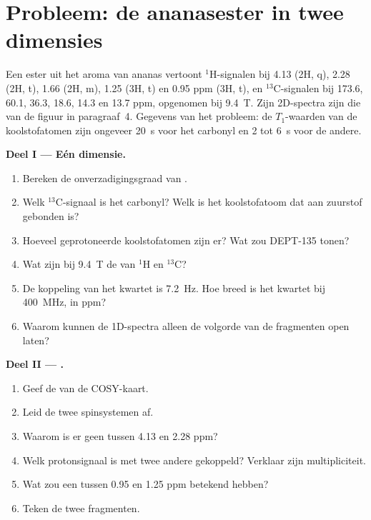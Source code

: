 \section{Probleem: de ananasester in twee dimensies}

\begin{problem}
\label{pb:b3:advanced-nmr:1}
Een ester  uit het aroma van ananas vertoont ${}^1$H-signalen bij 4.13 (2H,
q), 2.28 (2H, t), 1.66 (2H, m), 1.25 (3H, t) en 0.95 ppm (3H, t), en
${}^{13}$C-signalen bij 173.6, 60.1, 36.3, 18.6, 14.3 en 13.7 ppm, opgenomen
bij \qty{9.4}{T}. Zijn 2D-spectra zijn die van de figuur in paragraaf~4.
Gegevens van het probleem: de $T_1$-waarden
van de koolstofatomen zijn ongeveer \qty{20}{s} voor het carbonyl en 2 tot
\qty{6}{s} voor de andere.

\medskip\noindent\textbf{Deel I --- Eén dimensie.}
\begin{enumerate}
  \item Bereken de onverzadigingsgraad van .
  \item Welk ${}^{13}$C-signaal is het carbonyl? Welk is het koolstofatoom
        dat aan zuurstof gebonden is?
  \item Hoeveel geprotoneerde koolstofatomen zijn er? Wat zou DEPT-135 tonen?
  \item Wat zijn bij \qty{9.4}{T} de  van ${}^1$H en ${}^{13}$C?
  \item De koppeling van het kwartet is \qty{7.2}{Hz}. Hoe breed is het
        kwartet bij \qty{400}{MHz}, in ppm?
  \item Waarom kunnen de 1D-spectra alleen de volgorde van de fragmenten
        open laten?
\end{enumerate}

\medskip\noindent\textbf{Deel II --- .}
\begin{enumerate}[resume]
  \item Geef de  van de COSY-kaart.
  \item Leid de twee spinsystemen af.
  \item Waarom is er geen  tussen 4.13 en 2.28 ppm?
  \item Welk protonsignaal is met twee andere gekoppeld? Verklaar zijn
        multipliciteit.
  \item Wat zou een  tussen 0.95 en 1.25 ppm betekend hebben?
  \item Teken de twee fragmenten.
\end{enumerate}


\end{problem}
